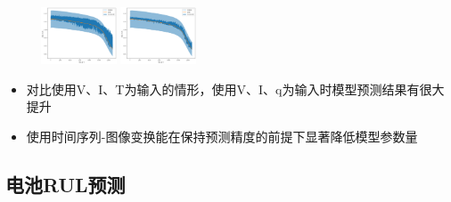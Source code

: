 \documentclass{beamer}
\begin{document}
\begin{frame}
\begin{figure}[htbp]
			{\label{fig:subfig3}\includegraphics[width=0.2\textwidth]{figures/soh_vitq/tri_group1_cell4_cnn_vit_trans.jpg}}
			{\label{fig:subfig4}\includegraphics[width=0.2\textwidth]{figures/soh_vitq/tri_group1_cell4_cnn_viq_trans.jpg}}
	\end{figure}
\end{frame}

\begin{frame}
\begin{table}[]
	\centering
	\captionsetup{font=tiny}
	\caption{四组实验CNN模型预测性能评估结果}
	\end{table}
	\begin{itemize}
		\item 对比使用V、I、T为输入的情形，使用V、I、q为输入时模型预测结果有很大提升
		\item 使用时间序列-图像变换能在保持预测精度的前提下显著降低模型参数量
	\end{itemize}
\end{frame}

\subsection{电池RUL预测}
\end{document}
